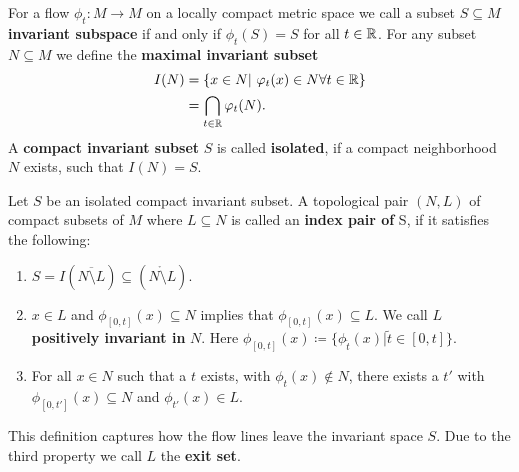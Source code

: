 \begin{definition}
    For a flow $\phi_t:M\to M$ on a locally compact metric space we call a subset $S\subseteq M$ \textbf{invariant subspace} if and only if $\phi_t(S)=S$ for all $t\in \mathbb{R}$. For any subset $N\subseteq M$ we define the \textbf{maximal invariant subset}
    \begin{align*}
        I(N)&=\{x\in N|~ \varphi_t(x)\in N \forall t\in \mathbb{R}\}\\
        &=\bigcap_{t\in \mathbb{R}} \varphi_t(N).
        \end{align*} A \textbf{compact invariant subset} $S$ is called \textbf{isolated}, if a compact neighborhood $N$ exists, such that $I(N)=S$.
\end{definition}
\begin{definition} \label{def: index pairs}
Let $S$ be an isolated compact invariant subset. A topological pair $(N,L)$ of compact subsets of $M$ where $L\subseteq N$ is called an \textbf{index pair of }S, if it satisfies the following:
\begin{enumerate}
    \item $S=I(\overline{N\setminus L})\subseteq (\mathring{N\setminus L})$.
    \item  $x\in L$ and $\phi_{[0,t]}(x)\subseteq N$ implies that  $\phi_{[0,t]}(x)\subseteq L$. We call $L$ \textbf{positively invariant in } $N$. Here $\phi_{[0,t]}(x)\coloneq\{ \phi_{\tilde{t}}(x)|\tilde{t}\in [0,t]\}$.
    \item For all $x\in N$ such that a $t$ exists, with $\phi_t(x)\not\in N$, there exists a $t'$ with $\phi_{[0,t']}(x)\subseteq N$ and $\phi_{t'}(x)\in L$.
\end{enumerate}
    This definition captures how the flow lines leave the invariant space $S$. Due to the third property we call $L$ the \textbf{exit set}.
\end{definition}


